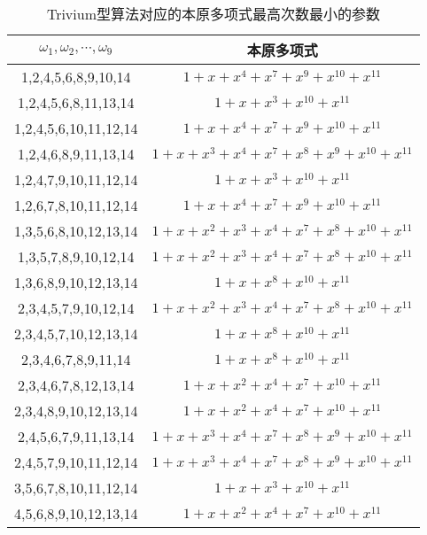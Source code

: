 \begin{table}[H]
  \label{table:trivium_minimal}
  \centering
  \caption{Trivium型算法对应的本原多项式最高次数最小的参数}
  \begin{tabular}{|c|c|}
  	\hline
  	\hline
    $\omega_{1},\omega_{2},\cdots,\omega_{9}$ & 本原多项式 \\ 
	\hline
    1,2,4,5,6,8,9,10,14 & $1+x+x^{4}+x^{7}+x^{9}+x^{10}+x^{11}$ \\
    \hline
    1,2,4,5,6,8,11,13,14 & $1+x+x^{3}+x^{10}+x^{11}$ \\
    \hline
    1,2,4,5,6,10,11,12,14 & $1+x+x^{4}+x^{7}+x^{9}+x^{10}+x^{11}$ \\
    \hline
    1,2,4,6,8,9,11,13,14 & $1+x+x^{3}+x^{4}+x^{7}+x^{8}+x^{9}+x^{10}+x^{11}$ \\
    \hline
    1,2,4,7,9,10,11,12,14 & $1+x+x^{3}+x^{10}+x^{11}$ \\
    \hline
    1,2,6,7,8,10,11,12,14 & $1+x+x^{4}+x^{7}+x^{9}+x^{10}+x^{11}$ \\
    \hline
    1,3,5,6,8,10,12,13,14 & $1+x+x^{2}+x^{3}+x^{4}+x^{7}+x^{8}+x^{10}+x^{11}$ \\
    \hline
    1,3,5,7,8,9,10,12,14 & $1+x+x^{2}+x^{3}+x^{4}+x^{7}+x^{8}+x^{10}+x^{11}$ \\
    \hline
    1,3,6,8,9,10,12,13,14 & $1+x+x^{8}+x^{10}+x^{11}$ \\
    \hline
    2,3,4,5,7,9,10,12,14 & $1+x+x^{2}+x^{3}+x^{4}+x^{7}+x^{8}+x^{10}+x^{11}$ \\
    \hline
    2,3,4,5,7,10,12,13,14 & $1+x+x^{8}+x^{10}+x^{11}$ \\
    \hline
    2,3,4,6,7,8,9,11,14 & $1+x+x^{8}+x^{10}+x^{11}$ \\
    \hline
    2,3,4,6,7,8,12,13,14 & $1+x+x^{2}+x^{4}+x^{7}+x^{10}+x^{11}$ \\
    \hline
    2,3,4,8,9,10,12,13,14 & $1+x+x^{2}+x^{4}+x^{7}+x^{10}+x^{11}$ \\
    \hline
    2,4,5,6,7,9,11,13,14  & $1+x+x^{3}+x^{4}+x^{7}+x^{8}+x^{9}+x^{10}+x^{11}$ \\
    \hline
    2,4,5,7,9,10,11,12,14 & $1+x+x^{3}+x^{4}+x^{7}+x^{8}+x^{9}+x^{10}+x^{11}$ \\
    \hline
    3,5,6,7,8,10,11,12,14 & $1+x+x^{3}+x^{10}+x^{11}$ \\
    \hline
    4,5,6,8,9,10,12,13,14 & $1+x+x^{2}+x^{4}+x^{7}+x^{10}+x^{11}$ \\
    \hline
\end{tabular}
\end{table}

